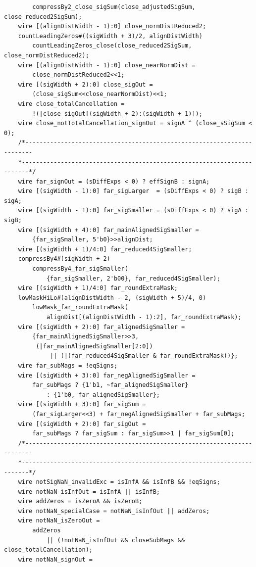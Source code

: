 \documentclass[12pt,letter]{article}
\begin{document}
\begin{lstlisting}
        compressBy2_close_sigSum(close_adjustedSigSum, close_reduced2SigSum);
    wire [(alignDistWidth - 1):0] close_normDistReduced2;
    countLeadingZeros#((sigWidth + 3)/2, alignDistWidth)
        countLeadingZeros_close(close_reduced2SigSum, close_normDistReduced2);
    wire [(alignDistWidth - 1):0] close_nearNormDist =
        close_normDistReduced2<<1;
    wire [(sigWidth + 2):0] close_sigOut =
        (close_sigSum<<close_nearNormDist)<<1;
    wire close_totalCancellation =
        !(|close_sigOut[(sigWidth + 2):(sigWidth + 1)]);
    wire close_notTotalCancellation_signOut = signA ^ (close_sSigSum < 0);
    /*------------------------------------------------------------------------
    *------------------------------------------------------------------------*/
    wire far_signOut = (sDiffExps < 0) ? effSignB : signA;
    wire [(sigWidth - 1):0] far_sigLarger  = (sDiffExps < 0) ? sigB : sigA;
    wire [(sigWidth - 1):0] far_sigSmaller = (sDiffExps < 0) ? sigA : sigB;
    wire [(sigWidth + 4):0] far_mainAlignedSigSmaller =
        {far_sigSmaller, 5'b0}>>alignDist;
    wire [(sigWidth + 1)/4:0] far_reduced4SigSmaller;
    compressBy4#(sigWidth + 2)
        compressBy4_far_sigSmaller(
            {far_sigSmaller, 2'b00}, far_reduced4SigSmaller);
    wire [(sigWidth + 1)/4:0] far_roundExtraMask;
    lowMaskHiLo#(alignDistWidth - 2, (sigWidth + 5)/4, 0)
        lowMask_far_roundExtraMask(
            alignDist[(alignDistWidth - 1):2], far_roundExtraMask);
    wire [(sigWidth + 2):0] far_alignedSigSmaller =
        {far_mainAlignedSigSmaller>>3,
         (|far_mainAlignedSigSmaller[2:0])
             || (|(far_reduced4SigSmaller & far_roundExtraMask))};
    wire far_subMags = !eqSigns;
    wire [(sigWidth + 3):0] far_negAlignedSigSmaller =
        far_subMags ? {1'b1, ~far_alignedSigSmaller}
            : {1'b0, far_alignedSigSmaller};
    wire [(sigWidth + 3):0] far_sigSum =
        (far_sigLarger<<3) + far_negAlignedSigSmaller + far_subMags;
    wire [(sigWidth + 2):0] far_sigOut =
        far_subMags ? far_sigSum : far_sigSum>>1 | far_sigSum[0];
    /*------------------------------------------------------------------------
    *------------------------------------------------------------------------*/
    wire notSigNaN_invalidExc = isInfA && isInfB && !eqSigns;
    wire notNaN_isInfOut = isInfA || isInfB;
    wire addZeros = isZeroA && isZeroB;
    wire notNaN_specialCase = notNaN_isInfOut || addZeros;
    wire notNaN_isZeroOut =
        addZeros
            || (!notNaN_isInfOut && closeSubMags && close_totalCancellation);
    wire notNaN_signOut =

\end{lstlisting}
\end{document}

